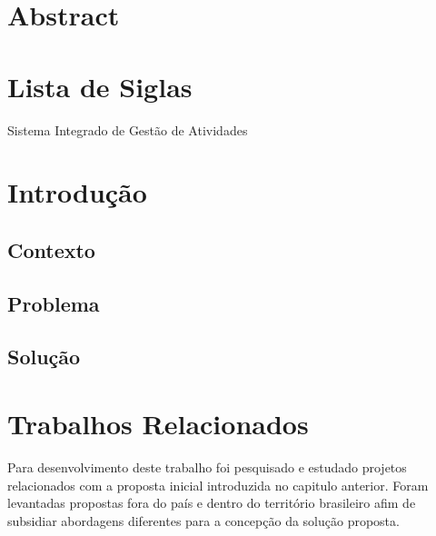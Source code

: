 \documentclass[12pt, a4paper]{report}
\begin{document}
\chapter*{Abstract}

\thispagestyle{empty}

\newpage
\tableofcontents
\thispagestyle{empty}


\listoffigures
\cleardoublepage


\listoftables
\cleardoublepage

\chapter*{Lista de Siglas}

\begin{acronym}
 {Sistema Integrado de Gestão de Atividades} 
\end{acronym}


\chapter{Introdução}
\section{Contexto}
\section{Problema}
\section{Solução}


\chapter {Trabalhos Relacionados}
Para desenvolvimento deste trabalho foi pesquisado e estudado projetos relacionados com a proposta inicial introduzida no capitulo anterior. Foram levantadas propostas fora do país e dentro do território brasileiro afim de subsidiar abordagens diferentes para a concepção da solução proposta.
\end{document}
